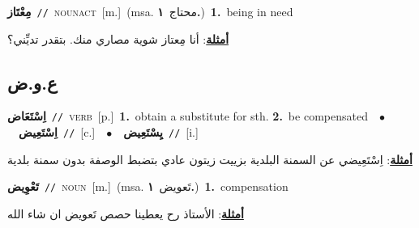 \documentclass[10pt,a4paper,twoside]{article} %
\begin{document}
\begin{multicols}{2}
{\setlength\topsep{0pt}\textbf{\foreignlanguage{arabic}{مِعْتَاز}}\ {\color{gray}\texttt{//}\color{black}}\ \textsc{noun\textunderscore act}\ [m.]\ \color{gray}(msa. \foreignlanguage{arabic}{محتاج}~\foreignlanguage{arabic}{\textbf{١.}})\color{black}\ \textbf{1.}~being in need\  \begin{flushright}\color{gray}\foreignlanguage{arabic}{\textbf{\underline{\foreignlanguage{arabic}{أمثلة}}}: أنا مِعتاز شوية مصاري منك. بتقدر تديِّني؟}\end{flushright}\color{black}} \vspace{2mm}

\vspace{-3mm}
\subsection*{\color{blue}\foreignlanguage{arabic}{ع.و.ض}\color{blue}{}} 

{\setlength\topsep{0pt}\textbf{\foreignlanguage{arabic}{اِسْتَعَاض}}\ {\color{gray}\texttt{//}\color{black}}\ \textsc{verb}\ [p.]\ \textbf{1.}~obtain a substitute for sth.  \textbf{2.}~be compensated\ \ $\bullet$\ \ \setlength\topsep{0pt}\textbf{\foreignlanguage{arabic}{اِسْتَعِيض}}\ {\color{gray}\texttt{//}\color{black}}\ [c.]\ \ $\bullet$\ \ \setlength\topsep{0pt}\textbf{\foreignlanguage{arabic}{يِسْتَعِيض}}\ {\color{gray}\texttt{//}\color{black}}\ [i.]\  \begin{flushright}\color{gray}\foreignlanguage{arabic}{\textbf{\underline{\foreignlanguage{arabic}{أمثلة}}}: اِسْتَعِيضي عن السمنة البلدية بزييت زيتون عادي بتضبط الوصفة بدون سمنة بلدية}\end{flushright}\color{black}} \vspace{2mm}

{\setlength\topsep{0pt}\textbf{\foreignlanguage{arabic}{تَعْوِيض}}\ {\color{gray}\texttt{//}\color{black}}\ \textsc{noun}\ [m.]\ \color{gray}(msa. \foreignlanguage{arabic}{تَعويض}~\foreignlanguage{arabic}{\textbf{١.}})\color{black}\ \textbf{1.}~compensation\  \begin{flushright}\color{gray}\foreignlanguage{arabic}{\textbf{\underline{\foreignlanguage{arabic}{أمثلة}}}: الأستاذ رح يعطينا حصص تَعويض ان شاء الله}\end{flushright}\color{black}} \vspace{2mm}


\end{multicols}
\end{document}
